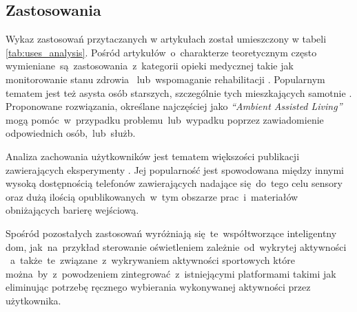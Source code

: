 \subsection{Zastosowania}
Wykaz zastosowań przytaczanych w artykułach został umieszczony w tabeli \ref{tab:uses_analysis}. Pośród artykułów~o~charakterze teoretycznym często wymieniane~są~zastosowania~z~kategorii opieki medycznej takie jak monitorowanie stanu zdrowia \cite{S22}~lub~wspomaganie rehabilitacji \cite{S35}. Popularnym tematem jest też asysta osób starszych, szczególnie tych mieszkających samotnie \cite{S21}. Proponowane rozwiązania, określane najczęściej jako \textit{``Ambient Assisted Living''} mogą pomóc~w~przypadku problemu~lub~wypadku poprzez zawiadomienie odpowiednich osób,~lub~służb.

Analiza zachowania użytkowników jest tematem większości publikacji zawierających eksperymenty \cite{S02, S59, S33}. Jej popularność jest spowodowana między innymi wysoką dostępnością telefonów zawierających nadające się~do~tego celu sensory oraz dużą ilością opublikowanych~w~tym obszarze prac~i~materiałów obniżających barierę wejściową.

Spośród pozostałych zastosowań wyróżniają się~te~współtworzące inteligentny dom, jak~na~przykład sterowanie oświetleniem zależnie~od~wykrytej aktywności \cite{S36}~a~także~te~związane~z~wykrywaniem aktywności sportowych \cite{S29} które można~by~z~powodzeniem zintegrować~z~istniejącymi platformami takimi jak  eliminując potrzebę ręcznego wybierania wykonywanej aktywności przez użytkownika.

